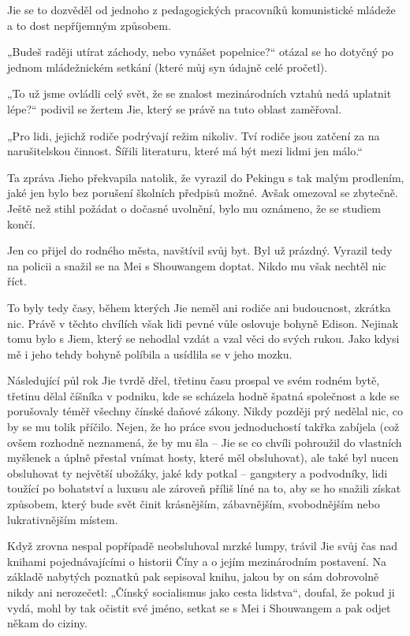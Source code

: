 Jie se to dozvěděl od jednoho z pedagogických pracovníků komunistické mládeže a to dost nepříjemným způsobem.

„Budeš raději utírat záchody, nebo vynášet popelnice?“ otázal se ho dotyčný po jednom mládežnickém setkání (které můj syn údajně celé pročetl).

„To už jsme ovládli celý svět, že se znalost mezinárodních vztahů nedá uplatnit lépe?“ podivil se žertem Jie, který se právě na tuto oblast zaměřoval.

„Pro lidi, jejichž rodiče podrývají režim nikoliv. Tví rodiče jsou zatčení za na narušitelskou činnost. Šířili literaturu, které má být mezi lidmi jen málo.“

Ta zpráva Jieho překvapila natolik, že vyrazil do Pekingu s tak malým prodlením, jaké jen bylo bez porušení školních předpisů možné. Avšak omezoval se zbytečně. Ještě než stihl požádat o dočasné uvolnění, bylo mu oznámeno, že se studiem končí.

Jen co přijel do rodného města, navštívil svůj byt. Byl už prázdný. Vyrazil tedy na policii a snažil se na Mei s Shouwangem doptat. Nikdo mu však nechtěl nic říct. 

To byly tedy časy, během kterých Jie neměl ani rodiče ani budoucnost, zkrátka nic.  Právě v těchto chvílích však lidi pevné vůle oslovuje bohyně Edison. Nejinak tomu bylo s Jiem, který se nehodlal vzdát a vzal věci do svých rukou. Jako kdysi mě i jeho tehdy bohyně políbila a usídlila se v jeho mozku.

Následující půl rok Jie tvrdě dřel, třetinu času prospal ve svém rodném bytě, třetinu dělal číšníka v podniku, kde se scházela hodně špatná společnost a kde se porušovaly téměř všechny čínské daňové zákony. Nikdy později prý nedělal nic, co by se mu tolik příčilo. Nejen, že ho práce svou jednoduchostí takřka zabíjela (což ovšem rozhodně neznamená, že by mu šla – Jie se co chvíli pohroužil do vlastních myšlenek a úplně přestal vnímat hosty, které měl obsluhovat), ale také byl nucen obsluhovat ty největší ubožáky, jaké kdy potkal – gangstery a podvodníky, lidi toužící po bohatství a luxusu ale zároveň příliš líné na to, aby se ho snažili získat způsobem, který bude svět činit krásnějším, zábavnějším, svobodnějším nebo lukrativnějším místem.

Když zrovna nespal popřípadě neobsluhoval mrzké lumpy, trávil Jie svůj čas nad knihami pojednávajícími o historii Číny a o jejím mezinárodním postavení. Na základě nabytých poznatků pak sepisoval knihu, jakou by on sám dobrovolně nikdy ani nerozečetl: „Čínský socialismus jako cesta lidstva“, doufal, že pokud ji vydá, mohl by tak očistit své jméno, setkat se s Mei i Shouwangem a pak odjet někam do ciziny.

